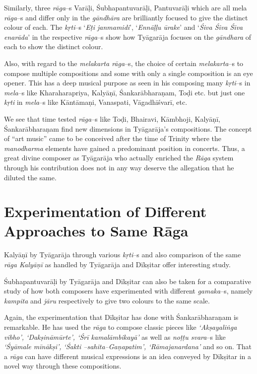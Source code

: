 Similarly, three \textit{rāga}–s Varāḷi, Śubhapantuvarāḷi, Pantuvarāḷi which are all mela \textit{rāga}–s and differ only in the \textit{gāndhāra} are brilliantly focused to give the distinct colour of each. The \textit{kṛti}–s ‘\textit{Eṭi janmamidi}’, ‘\textit{Ennāḷḷu ūrake}’ and ‘\textit{Śiva Śiva Śiva enarāda}’ in the respective \textit{rāga}–s show how Tyāgarāja focuses on the \textit{gāndhara} of each to show the distinct colour.

Also, with regard to the \textit{melakarta rāga}–s, the choice of certain \textit{melakarta}–s to compose multiple compositions and some with only a single composition is an eye opener. This has a deep musical purpose as seen in his composing many \textit{kṛti}–s in \textit{mela}–s like Kharaharapriya, Kalyāṇī, Śankarābharaṇam, Toḍi etc. but just one \textit{kṛti} in \textit{mela}–s like Kāntāmaṇi, Vanaspati, Vāgadhīśvarī, etc.

We see that time tested \textit{rāga}–s like Toḍi, Bhairavi, Kāmbhoji, Kalyāṇī, Śankarābharaṇam find new dimensions in Tyāgarāja’s compositions. The concept of “art music” came to be conceived after the time of Trinity where the \textit{manodharma} elements have gained a predominant position in concerts. Thus, a great divine composer as Tyāgarāja who actually enriched the \textit{Rāga} system through his contribution does not in any way deserve the allegation that he diluted the same.


\section*{Experimentation of Different Approaches to Same Rāga}

Kalyāṇī by Tyāgarāja through various \textit{kṛti}–s and also comparison of the same \textit{rāga Kalyāṇī} as handled by Tyāgarāja and Dīkṣitar offer interesting study.

Śubhapantuvarāḷi by Tyāgarāja and Dīkṣitar can also be taken for a comparative study of how both composers have experimented with different \textit{gamaka}–s, namely \textit{kampita} and \textit{jāru} respectively to give two colours to the same scale.

Again, the experimentation that Dīkṣitar has done with Śankarābhara\-ṇam is remarkable. He has used the \textit{rāga} to compose classic pieces like \textit{‘Akṣayaliṅga vibho’, ‘Dakṣināmūrte’, ‘Śrī kamalāmbikayā’} as well as \textit{noṭṭu svara}–s like \textit{‘Śyāmale mīnākṣi’, ‘Śakti –sahita–Gaṇapatim’, ‘Rāmajanardana’} and so on. That a \textit{rāga} can have different musical expressions is an idea conveyed by Dīkṣitar in a novel way through these compositions.

